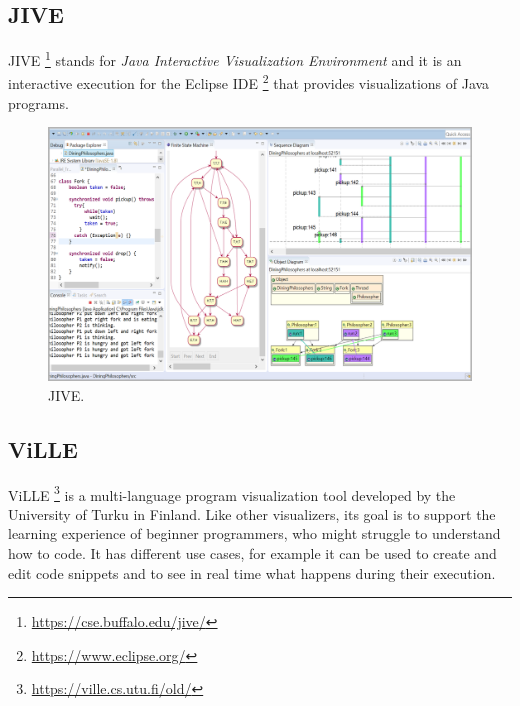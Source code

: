 \documentclass[]{usiinfbachelorproject}
\begin{document}
\subsection{JIVE}

JIVE \footnote{\url{https://cse.buffalo.edu/jive/}} stands for \emph{Java Interactive Visualization Environment} and it is an interactive execution for the Eclipse IDE \footnote{\url{https://www.eclipse.org/}} that provides visualizations of Java programs.

\begin{figure}[h]
\centering
\includegraphics[width=\textwidth]{figures/jive.png}
\caption {JIVE.}
\end{figure}

\subsection{ViLLE}

ViLLE \footnote{\url{https://ville.cs.utu.fi/old/}} is a multi-language program visualization tool developed by the University of Turku in Finland. Like other visualizers, its goal is to support the learning experience of beginner programmers, who might struggle to understand how to code. It has different use cases, for example it can be used to create and edit code snippets and to see in real time what happens during their execution.
\end{document}
